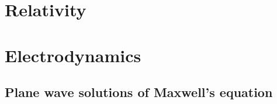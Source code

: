 %
%
\part{Relativity}
   
   
   
   
   
   
   
   

\part{Electrodynamics}
   
   
   
   
   
   
   
   
   
   
   
  
   
   

   
   
   
   
   
   
   
   
   
   
   

   \chapter{Plane wave solutions of Maxwell's equation}
      

